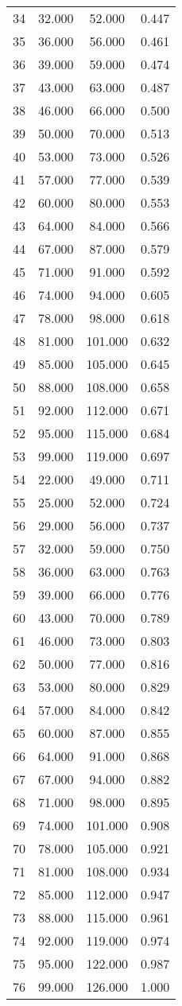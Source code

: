 \begin{tabular}{cccc}
  34 & 32.000 & 52.000 & 0.447 \\ 
  35 & 36.000 & 56.000 & 0.461 \\ 
  36 & 39.000 & 59.000 & 0.474 \\ 
  37 & 43.000 & 63.000 & 0.487 \\ 
  38 & 46.000 & 66.000 & 0.500 \\ 
  39 & 50.000 & 70.000 & 0.513 \\ 
  40 & 53.000 & 73.000 & 0.526 \\ 
  41 & 57.000 & 77.000 & 0.539 \\ 
  42 & 60.000 & 80.000 & 0.553 \\ 
  43 & 64.000 & 84.000 & 0.566 \\ 
  44 & 67.000 & 87.000 & 0.579 \\ 
  45 & 71.000 & 91.000 & 0.592 \\ 
  46 & 74.000 & 94.000 & 0.605 \\ 
  47 & 78.000 & 98.000 & 0.618 \\ 
  48 & 81.000 & 101.000 & 0.632 \\ 
  49 & 85.000 & 105.000 & 0.645 \\ 
  50 & 88.000 & 108.000 & 0.658 \\ 
  51 & 92.000 & 112.000 & 0.671 \\ 
  52 & 95.000 & 115.000 & 0.684 \\ 
  53 & 99.000 & 119.000 & 0.697 \\ 
  54 & 22.000 & 49.000 & 0.711 \\ 
  55 & 25.000 & 52.000 & 0.724 \\ 
  56 & 29.000 & 56.000 & 0.737 \\ 
  57 & 32.000 & 59.000 & 0.750 \\ 
  58 & 36.000 & 63.000 & 0.763 \\ 
  59 & 39.000 & 66.000 & 0.776 \\ 
  60 & 43.000 & 70.000 & 0.789 \\ 
  61 & 46.000 & 73.000 & 0.803 \\ 
  62 & 50.000 & 77.000 & 0.816 \\ 
  63 & 53.000 & 80.000 & 0.829 \\ 
  64 & 57.000 & 84.000 & 0.842 \\ 
  65 & 60.000 & 87.000 & 0.855 \\ 
  66 & 64.000 & 91.000 & 0.868 \\ 
  67 & 67.000 & 94.000 & 0.882 \\ 
  68 & 71.000 & 98.000 & 0.895 \\ 
  69 & 74.000 & 101.000 & 0.908 \\ 
  70 & 78.000 & 105.000 & 0.921 \\ 
  71 & 81.000 & 108.000 & 0.934 \\ 
  72 & 85.000 & 112.000 & 0.947 \\ 
  73 & 88.000 & 115.000 & 0.961 \\ 
  74 & 92.000 & 119.000 & 0.974 \\ 
  75 & 95.000 & 122.000 & 0.987 \\ 
  76 & 99.000 & 126.000 & 1.000 \\ 
   \hline
\end{tabular}
